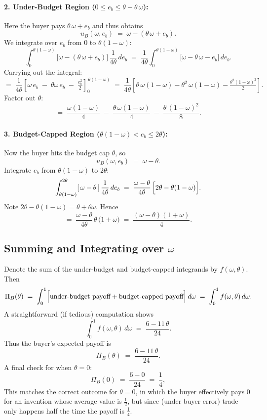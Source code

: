 \documentclass{article}
\begin{document}
\paragraph{2. Under-Budget Region (\(0 \le e_b \le \theta - \theta\,\omega\)):}
Here the buyer pays \(\theta\,\omega + e_b\) and thus obtains
\[
u_B(\omega,e_b)
\;=\;
\omega - (\theta\,\omega + e_b).
\]
We integrate over \(e_b\) from \(0\) to \(\theta(1-\omega)\):
\[
\int_{0}^{\theta(1-\omega)}
   \bigl[\omega - (\theta\,\omega + e_b)\bigr]
\,\frac{1}{4\theta}\,d e_b
\;=\;
\frac{1}{4\theta}
\int_{0}^{\theta(1-\omega)}
   \bigl[\omega - \theta\,\omega - e_b\bigr]
\,d e_b.
\]
Carrying out the integral:
\[
=\;
\frac{1}{4\theta}
\left[
   \omega\,e_b
   \;-\;\theta\omega\,e_b
   \;-\;\tfrac{e_b^2}{2}
\right]_{0}^{\,\theta(1-\omega)}
\;=\;
\frac{1}{4\theta}
\left[
  \theta\,\omega(1-\omega)
  - \theta^2\,\omega(1-\omega)
  - \tfrac{\theta^2(1-\omega)^2}{2}
\right].
\]
Factor out \(\theta\):
\[
=\;
\frac{\omega(1-\omega)}{4}
\;-\;
\frac{\theta\,\omega(1-\omega)}{4}
\;-\;
\frac{\theta\,(1-\omega)^2}{8}.
\]

\paragraph{3. Budget-Capped Region (\(\theta(1-\omega) < e_b \le 2\theta\)):}
Now the buyer hits the budget cap \(\theta\), so 
\[
u_B(\omega,e_b) \;=\; \omega - \theta.
\]
Integrate \(e_b\) from \(\theta(1-\omega)\) to \(2\theta\):
\[
\int_{\theta(1-\omega)}^{2\theta}
   [\,\omega - \theta\,]
\,\frac{1}{4\theta}\,d e_b
\;=\;
\frac{\omega - \theta}{4\theta}
\,\Bigl[
   2\theta - \theta(1-\omega)
\Bigr].
\]
Note \(2\theta - \theta(1-\omega)=\theta + \theta\omega\). Hence
\[
=\;
\frac{\omega - \theta}{4\theta}
\,\theta\,\bigl(1+\omega\bigr)
\;=\;
\frac{(\omega - \theta)(1 + \omega)}{4}.
\]

\subsection*{Summing and Integrating over \(\omega\)}
Denote the sum of the under-budget and budget-capped integrands by \(f(\omega,\theta)\). Then
\[
\Pi_B(\theta)
\;=\;
\int_0^1 
   \Bigl[\text{under-budget payoff} + \text{budget-capped payoff}\Bigr]
\,d\omega
\;=\;
\int_{0}^{1} f(\omega,\theta)\,d\omega.
\]
A straightforward (if tedious) computation shows 
\[
\int_0^1 f(\omega,\theta)\,d\omega
\;=\;
\frac{6 - 11\,\theta}{24}.
\]
Thus the buyer’s expected payoff is
\[
\Pi_B(\theta) 
\;=\;
\frac{6-11\,\theta}{24}.
\]
A final check for when $\theta=0$:
\[
\Pi_B(0)
\;=\;
\frac{6 - 0}{24}
\;=\;
\frac{1}{4},
\]
This matches the correct outcome for \(\theta=0\), in which the buyer effectively pays 0 for an invention whose average value is \(\tfrac{1}{2}\), but since (under buyer error) trade only happens half the time the payoff is \(\tfrac{1}{4}\).
\end{document}
